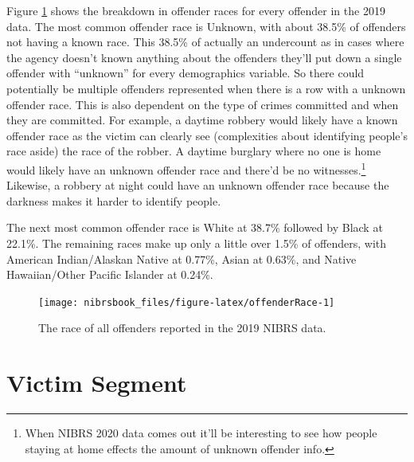 \documentclass[
  12pt,
  openany]{book}
\begin{document}
Figure \ref{fig:offenderRace} shows the breakdown in offender races for every offender in the 2019 data. The most common offender race is Unknown, with about 38.5\% of offenders not having a known race. This 38.5\% of actually an undercount as in cases where the agency doesn't known anything about the offenders they'll put down a single offender with ``unknown'' for every demographics variable. So there could potentially be multiple offenders represented when there is a row with a unknown offender race. This is also dependent on the type of crimes committed and when they are committed. For example, a daytime robbery would likely have a known offender race as the victim can clearly see (complexities about identifying people's race aside) the race of the robber. A daytime burglary where no one is home would likely have an unknown offender race and there'd be no witnesses.\footnote{When NIBRS 2020 data comes out it'll be interesting to see how people staying at home effects the amount of unknown offender info.} Likewise, a robbery at night could have an unknown offender race because the darkness makes it harder to identify people.

The next most common offender race is White at 38.7\% followed by Black at 22.1\%. The remaining races make up only a little over 1.5\% of offenders, with American Indian/Alaskan Native at 0.77\%, Asian at 0.63\%, and Native Hawaiian/Other Pacific Islander at 0.24\%.

\begin{figure}

{\centering \texttt{[image: nibrsbook\_files/figure-latex/offenderRace-1]} 

}

\caption{The race of all offenders reported in the 2019 NIBRS data.}\label{fig:offenderRace}
\end{figure}

\hypertarget{victim-segment-1}{%
\chapter{Victim Segment}\label{victim-segment-1}}
\end{document}
